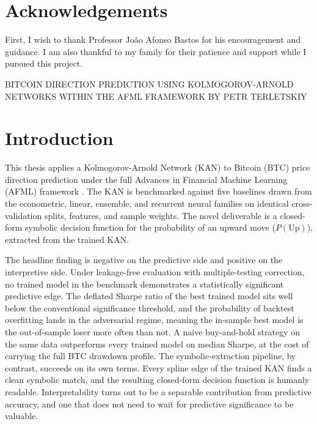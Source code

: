 \documentclass[12pt,a4paper,oneside]{article}
\begin{document}
\newpage
\thispagestyle{plain}
\section*{Acknowledgements}

First, I wish to thank Professor João Afonso Bastos for his encouragement and guidance. I am also thankful to my family for their patience and support while I pursued this project.


\newpage
\thispagestyle{plain}

\setcounter{page}{1}

\begin{center}
\textsc{BITCOIN DIRECTION PREDICTION USING KOLMOGOROV-ARNOLD NETWORKS WITHIN THE AFML FRAMEWORK BY PETR TERLETSKIY}\\
\end{center}


\section{Introduction}\label{sec:introduction}

This thesis applies a Kolmogorov-Arnold Network (KAN) to Bitcoin (BTC) price direction prediction under the full Advances in Financial Machine Learning (AFML) framework \citep{lopez_de_prado_2018}. The KAN is benchmarked against five baselines drawn from the econometric, linear, ensemble, and recurrent neural families on identical cross-validation splits, features, and sample weights. The novel deliverable is a closed-form symbolic decision function for the probability of an upward move ($P(\text{Up})$), extracted from the trained KAN.

The headline finding is negative on the predictive side and positive on the interpretive side. Under leakage-free evaluation with multiple-testing correction, no trained model in the benchmark demonstrates a statistically significant predictive edge. The deflated Sharpe ratio of the best trained model sits well below the conventional significance threshold, and the probability of backtest overfitting lands in the adversarial regime, meaning the in-sample best model is the out-of-sample loser more often than not. A naive buy-and-hold strategy on the same data outperforms every trained model on median Sharpe, at the cost of carrying the full BTC drawdown profile. The symbolic-extraction pipeline, by contrast, succeeds on its own terms. Every spline edge of the trained KAN finds a clean symbolic match, and the resulting closed-form decision function is humanly readable. Interpretability turns out to be a separable contribution from predictive accuracy, and one that does not need to wait for predictive significance to be valuable.
\end{document}
